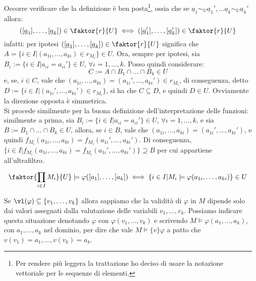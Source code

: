 \begin{remark}
    Occorre verificare che la definizione è ben posta\footnote{Per rendere più leggera la trattazione ho deciso di usare la notazione vettoriale per le sequenze di elementi.},
    ossia che se $\underline a_1 \sim_U \underline a_1',\ldots \underline a_k \sim_U \underline a_k'$ allora:
    \[ ([\underline a_1],\ldots,[\underline a_k]) \in \faktor{r}{U} \iff ([\underline a_1'],\ldots,[\underline a_k']) \in \faktor{r}{U}
    \]
    infatti: per ipotesi $([\underline a_1],\ldots,[\underline a_k]) \in \faktor{r}{U}$ significa che $A = \{ i \in I | (a_{1i},\ldots,a_{ki}) \in r_{M_i}\} \in U$. Ora, sempre per ipotesi, sia $B_\iota := \{ i \in I | a_{\iota i} = a_{\iota i}'\} \in U$, $\forall \iota = 1,\ldots,k$. Posso quindi considerare:
    \[ C := A \cap B_1 \cap \ldots \cap B_k \in U
    \]
    e, se, $i \in C$, vale che $(a_{1i},\ldots,a_{ki}) = (a_{1i}',\ldots,a_{ki}') \in r_{M_i}$, di conseguenza, detto $D := \{ i \in I | (a_{1i}',\ldots,a_{ki}') \in r_{M_i}\}$, si ha che $C \subseteq D$, e quindi $D \in U$. Ovviamente la direzione opposta è simmetrica.\\
    Si procede similmente per la buona definizione dell'interpretazione delle funzioni: similmente a prima, sia $B_\iota := \{ i \in I | a_{\iota i} = a_{\iota i}'\} \in U$, $\forall \iota = 1,\ldots,k$, e sia $B := B_1 \cap \ldots \cap B_k \in U$, allora, se $i \in B$, vale che $(a_{1i},\ldots,a_{ki}) = (a_{1i}',\ldots,a_{ki}')$, e quindi $f_{M_i}(a_{1i},\ldots,a_{ki}) = f_{M_i}(a_{1i}',\ldots,a_{ki}')$.
    Di conseguenza, $\{i \in I | f_{M_i}(a_{1i},\ldots,a_{ki}) = f_{M_i}(a_{1i}',\ldots,a_{ki}')\} \supseteq B$ per cui appartiene all'ultrafiltro.
\end{remark}

\begin{theorem}
    \[ \faktor{\prod_{i \in I} M_i}{U} \models \varphi([a_1],\ldots,[a_k]) \iff \{i \in I | M_i \models \varphi(a_{1i},\ldots,a_{ki})\} \in U
    \]
\end{theorem}

\begin{notation}
    Se $\vl(\varphi) \subseteq \{v_1,\ldots,v_k\}$ allora sappiamo che la validità di $\varphi$ in $M$ dipende solo dai valori assegnati dalla valutazione delle variabili $v_1,\ldots,v_k$.
    Possiamo indicare questa situazione denotando $\varphi$ con $\varphi(v_1,\ldots,v_k)$ e scrivendo $M \models \varphi(a_1,\ldots,a_k)$, con $a_1,\ldots,a_k$ nel dominio, per dire 
    che vale $M \models\{v\} \varphi$ a patto che $v(v_1) = a_1,\ldots,v(v_k) = a_k$.
\end{notation}

